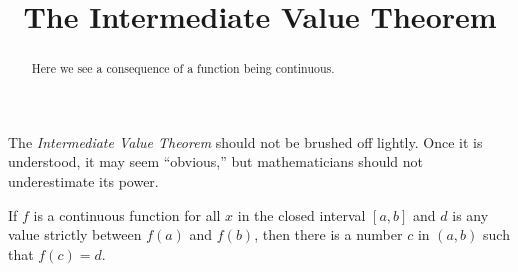 \documentclass{ximera}
\title[Dig-In:]{The Intermediate Value Theorem}
\begin{document}
\begin{abstract}
  Here we see a consequence of a function being continuous.
\end{abstract}
\maketitle



The \textit{Intermediate Value Theorem} should not be brushed off
lightly. Once it is understood, it may seem ``obvious,'' but mathematicians should not underestimate its power.

\begin{theorem}\label{theorem:IVT}
	If $f$ is a continuous function for all $x$ in the closed interval
	$[a,b]$ and $d$ is any value strictly between $f(a)$ and $f(b)$, then there is a number
	$c$ in $(a, b)$ such that $f(c) = d$.
\end{theorem}

\end{document}
